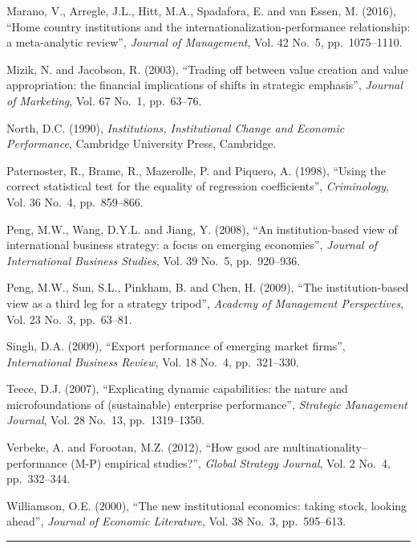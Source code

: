 \documentclass[
  12pt]{article}
\begin{document}
Marano, V., Arregle, J.L., Hitt, M.A., Spadafora, E. and van Essen, M.
(2016), ``Home country institutions and the
internationalization-performance relationship: a meta-analytic review'',
\emph{Journal of Management}, Vol. 42 No.~5, pp.~1075--1110.

Mizik, N. and Jacobson, R. (2003), ``Trading off between value creation
and value appropriation: the financial implications of shifts in
strategic emphasis'', \emph{Journal of Marketing}, Vol. 67 No.~1,
pp.~63--76.

North, D.C. (1990), \emph{Institutions, Institutional Change and
Economic Performance}, Cambridge University Press, Cambridge.

Paternoster, R., Brame, R., Mazerolle, P. and Piquero, A. (1998),
``Using the correct statistical test for the equality of regression
coefficients'', \emph{Criminology}, Vol. 36 No.~4, pp.~859--866.

Peng, M.W., Wang, D.Y.L. and Jiang, Y. (2008), ``An institution-based
view of international business strategy: a focus on emerging
economies'', \emph{Journal of International Business Studies}, Vol. 39
No.~5, pp.~920--936.

Peng, M.W., Sun, S.L., Pinkham, B. and Chen, H. (2009), ``The
institution-based view as a third leg for a strategy tripod'',
\emph{Academy of Management Perspectives}, Vol. 23 No.~3, pp.~63--81.

Singh, D.A. (2009), ``Export performance of emerging market firms'',
\emph{International Business Review}, Vol. 18 No.~4, pp.~321--330.

Teece, D.J. (2007), ``Explicating dynamic capabilities: the nature and
microfoundations of (sustainable) enterprise performance'',
\emph{Strategic Management Journal}, Vol. 28 No.~13, pp.~1319--1350.

Verbeke, A. and Forootan, M.Z. (2012), ``How good are
multinationality--performance (M-P) empirical studies?'', \emph{Global
Strategy Journal}, Vol. 2 No.~4, pp.~332--344.

Williamson, O.E. (2000), ``The new institutional economics: taking
stock, looking ahead'', \emph{Journal of Economic Literature}, Vol. 38
No.~3, pp.~595--613.

\begin{center}\rule{0.5\linewidth}{0.5pt}\end{center}
\end{document}
